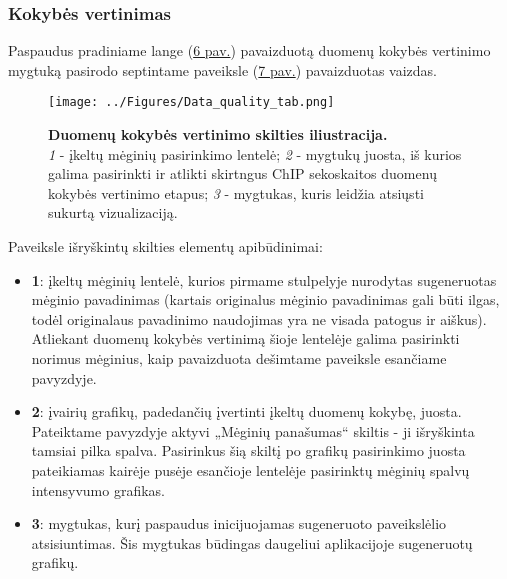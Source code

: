\documentclass[12pt]{article}
\begin{document}
\newpage

\subsubsection*{Kokybės vertinimas}
Paspaudus pradiniame lange (\hyperref[fig:image6]{6 pav.}) pavaizduotą duomenų
kokybės vertinimo mygtuką pasirodo septintame paveiksle
(\hyperref[fig:image7]{7 pav.}) pavaizduotas vaizdas.

\begin{figure}[ht]
    \begin{center}
        \captionsetup{justification=centering}
        \texttt{[image: ../Figures/Data\_quality\_tab.png]}
        \vspace{-1.5\baselineskip}
        \caption{\small\textbf{Duomenų kokybės vertinimo skilties
                                iliustracija.}\\
            \emph{1} - įkeltų mėginių pasirinkimo lentelė;
            \emph{2} - mygtukų juosta, iš kurios galima pasirinkti ir atlikti
                skirtngus ChIP sekoskaitos duomenų kokybės vertinimo etapus;
            \emph{3} - mygtukas, kuris leidžia atsiųsti sukurtą vizualizaciją.}
    \end{center}
    \label{fig:image7}
\end{figure}

Paveiksle išryškintų skilties elementų apibūdinimai:
\begin{itemize}
    \item \textbf{\large{1}}: įkeltų mėginių lentelė, kurios pirmame stulpelyje
        nurodytas sugeneruotas mėginio pavadinimas (kartais originalus mėginio
        pavadinimas gali būti ilgas, todėl originalaus pavadinimo naudojimas
        yra ne visada patogus ir aiškus). Atliekant duomenų kokybės vertinimą
        šioje lentelėje galima pasirinkti norimus mėginius, kaip pavaizduota
        dešimtame paveiksle esančiame pavyzdyje.
    \item \textbf{\large{2}}: įvairių grafikų, padedančių įvertinti įkeltų
        duomenų kokybę, juosta. Pateiktame pavyzdyje aktyvi „Mėginių
        panašumas“ skiltis - ji išryškinta tamsiai pilka spalva. Pasirinkus
        šią skiltį po grafikų pasirinkimo juosta pateikiamas kairėje pusėje
        esančioje lentelėje pasirinktų mėginių spalvų intensyvumo grafikas.
    \item \textbf{\large{3}}: mygtukas, kurį paspaudus inicijuojamas sugeneruoto
        paveikslėlio atsisiuntimas. Šis mygtukas būdingas daugeliui aplikacijoje
        sugeneruotų grafikų.
\end{itemize}
\end{document}
